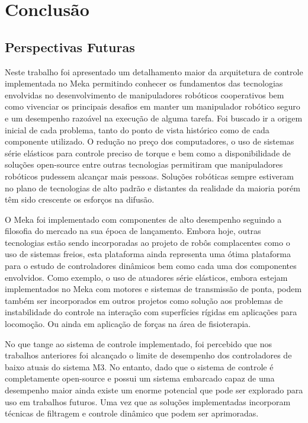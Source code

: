 \chapter{Conclusão} \label{ch:conclusoes}

\section{Perspectivas Futuras}

Neste trabalho foi apresentado um detalhamento maior da arquitetura de controle implementada no Meka permitindo conhecer os fundamentos das tecnologias envolvidas no desenvolvimento de manipuladores robóticos cooperativos bem como vivenciar os principais desafios em manter um manipulador robótico seguro e um desempenho razoável na execução de alguma tarefa. Foi buscado ir a origem inicial de cada problema, tanto do ponto de vista histórico como de cada componente utilizado. O redução no preço dos computadores, o uso de sistemas série elásticos para controle preciso de torque e bem como a disponibilidade de soluções open-source entre outras tecnologias permitiram que manipuladores robóticos pudessem alcançar mais pessoas. Soluções robóticas sempre estiveram no plano de tecnologias de alto padrão e distantes da realidade da maioria porém têm sido crescente os esforços na difusão.

O Meka foi implementado com componentes de alto desempenho seguindo a filosofia do mercado na sua época de lançamento. Embora hoje, outras tecnologias estão sendo incorporadas ao projeto de robôs complacentes como o uso de sistemas freios, esta plataforma ainda representa uma ótima plataforma para o estudo de controladores dinâmicos bem como cada uma dos componentes envolvidos. Como exemplo, o uso de atuadores série elásticos, embora estejam implementados no Meka com motores e sistemas de transmissão de ponta, podem também ser incorporados em outros projetos como solução aos problemas de instabilidade do controle na interação com superfícies rígidas em aplicações para locomoção. Ou ainda em aplicação de forças na área de fisioterapia.

No que tange ao sistema de controle implementado, foi percebido que nos trabalhos anteriores foi alcançado o limite de desempenho dos controladores de baixo atuais do sistema M3. No entanto, dado que o sistema de controle é completamente open-source e possui um sistema embarcado capaz de uma desempenho maior ainda existe um enorme potencial que pode ser explorado para uso em trabalhos futuros. Uma vez que as soluções implementadas incorporam técnicas de filtragem e controle dinâmico que podem ser aprimoradas.

